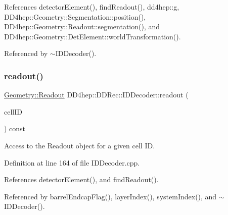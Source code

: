 References detector\+Element(), find\+Readout(), dd4hep\+::g, D\+D4hep\+::\+Geometry\+::\+Segmentation\+::position(), D\+D4hep\+::\+Geometry\+::\+Readout\+::segmentation(), and D\+D4hep\+::\+Geometry\+::\+Det\+Element\+::world\+Transformation().



Referenced by $\sim$\+I\+D\+Decoder().

\hypertarget{class_d_d4hep_1_1_d_d_rec_1_1_i_d_decoder_a17c6775e5a61c095981bcda7014fa5e9}{}\label{class_d_d4hep_1_1_d_d_rec_1_1_i_d_decoder_a17c6775e5a61c095981bcda7014fa5e9} 
\subsubsection{\texorpdfstring{readout()}{readout()}\hspace{0.1cm}{\footnotesize\ttfamily [1/2]}}
{\footnotesize\ttfamily \hyperlink{class_d_d4hep_1_1_geometry_1_1_readout}{Geometry\+::\+Readout} D\+D4hep\+::\+D\+D\+Rec\+::\+I\+D\+Decoder\+::readout (\begin{DoxyParamCaption}\item[{const \hyperlink{namespace_d_d4hep_1_1_d_d_rec_af5cecc2e566eeaedb430b92df23971d4}{Cell\+ID} \&}]{cell\+ID }\end{DoxyParamCaption}) const}



Access to the Readout object for a given cell ID. 



Definition at line 164 of file I\+D\+Decoder.\+cpp.



References detector\+Element(), and find\+Readout().



Referenced by barrel\+Endcap\+Flag(), layer\+Index(), system\+Index(), and $\sim$\+I\+D\+Decoder().

\hypertarget{class_d_d4hep_1_1_d_d_rec_1_1_i_d_decoder_a7aa7188dd4516f2a73a6ee8f29d94d00}{}\label{class_d_d4hep_1_1_d_d_rec_1_1_i_d_decoder_a7aa7188dd4516f2a73a6ee8f29d94d00} 
